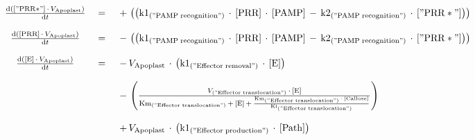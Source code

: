 $$\begin{array}{ccl}
\frac {\mathrm{d}\left( {{\mathrm{["PRR*"]}} \, \cdot \, {V}_{\mathrm{Apoplast}} } \right) }  {\mathrm{d}{t} }  \; &=& \;  { \, + \, \left(\left( {{\mathrm{k1}}_{\mathrm{("PAMP\;recognition")}} \, \cdot \, {\mathrm{[PRR]}} \, \cdot \, {\mathrm{[PAMP]}} \, - \, {\mathrm{k2}}_{\mathrm{("PAMP\;recognition")}} \, \cdot \, {\mathrm{["PRR*"]}} } \right)\right) } \\ 
 && \\ 
\frac {\mathrm{d}\left( {{\mathrm{[PRR]}} \, \cdot \, {V}_{\mathrm{Apoplast}} } \right) }  {\mathrm{d}{t} }  \; &=& \;  { \, - \, \left(\left( {{\mathrm{k1}}_{\mathrm{("PAMP\;recognition")}} \, \cdot \, {\mathrm{[PRR]}} \, \cdot \, {\mathrm{[PAMP]}} \, - \, {\mathrm{k2}}_{\mathrm{("PAMP\;recognition")}} \, \cdot \, {\mathrm{["PRR*"]}} } \right)\right) } \\ 
 && \\ 
\frac {\mathrm{d}\left( {{\mathrm{[E]}} \, \cdot \, {V}_{\mathrm{Apoplast}} } \right) }  {\mathrm{d}{t} }  \; &=& \;  { \, - \, {V}_{\mathrm{Apoplast}} \, \cdot \, \left( {{\mathrm{k1}}_{\mathrm{("Effector\;removal")}} \, \cdot \, {\mathrm{[E]}} } \right) } \\ 
 && \\ 
 \; && \;  { \, - \, \left(\frac {{V}_{\mathrm{("Effector\;translocation")}} \, \cdot \, {\mathrm{[E]}} }  { {{\mathrm{Km}}_{\mathrm{("Effector\;translocation")}} \, + \, {\mathrm{[E]}} }  \, + \, \frac {{\mathrm{Km}}_{\mathrm{("Effector\;translocation")}} \, \cdot \, {\mathrm{[Callose]}} } {{\mathrm{Ki}}_{\mathrm{("Effector\;translocation")}} } } \right) } \\ 
 && \\ 
 \; && \;  { \, + \, {V}_{\mathrm{Apoplast}} \, \cdot \, \left( {{\mathrm{k1}}_{\mathrm{("Effector\;production")}} \, \cdot \, {\mathrm{[Path]}} } \right) } \\ 
 && \\ 
\end{array}
$$